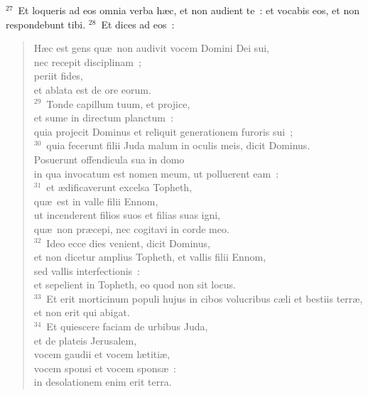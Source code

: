 ${}^{27}$~Et loqueris ad eos omnia verba h\ae c, et non audient te~: et vocabis eos, et non respondebunt tibi.
${}^{28}$~Et dices ad eos~: \begin{flushleft}\begin{verse}H\ae c est gens qu\ae\ non audivit vocem Domini Dei sui,\\ nec recepit disciplinam~;\\ periit fides,\\ et ablata est de ore eorum.\\
${}^{29}$~Tonde capillum tuum, et projice,\\ et sume in directum planctum~:\\ quia projecit Dominus et reliquit generationem furoris sui~;\\
${}^{30}$~quia fecerunt filii Juda malum in oculis meis, dicit Dominus.\\ Posuerunt offendicula sua in domo\\ in qua invocatum est nomen meum, ut polluerent eam~:\\
${}^{31}$~et \ae dificaverunt excelsa Topheth,\\ qu\ae\ est in valle filii Ennom,\\ ut incenderent filios suos et filias suas igni,\\ qu\ae\ non pr\ae cepi, nec cogitavi in corde meo.\\
${}^{32}$~Ideo ecce dies venient, dicit Dominus,\\ et non dicetur amplius Topheth, et vallis filii Ennom,\\ sed vallis interfectionis~:\\ et sepelient in Topheth, eo quod non sit locus.\\
${}^{33}$~Et erit morticinum populi hujus in cibos volucribus c\ae li et bestiis terr\ae ,\\ et non erit qui abigat.\\
${}^{34}$~Et quiescere faciam de urbibus Juda,\\ et de plateis Jerusalem,\\ vocem gaudii et vocem l\ae titi\ae ,\\ vocem sponsi et vocem spons\ae~:\\ in desolationem enim erit terra.\end{verse}\end{flushleft}


